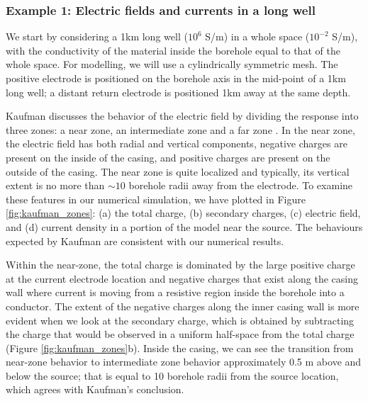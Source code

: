 \subsubsection{Example 1: Electric fields and currents in a long well}

We start by considering a 1km long well ($10^6$ S/m) in a whole space ($10^{-2}$ S/m), with the conductivity of the material inside the borehole equal to that of the whole space.  For modelling, we will use a cylindrically symmetric mesh. The positive electrode is positioned on the borehole axis in the mid-point of a 1km long well;  a distant return electrode is positioned 1km away at the same depth.

Kaufman discusses the behavior of the electric field by dividing the response into three zones: a near zone, an intermediate zone and a far zone \citep{Kaufman1990, Kaufman1993}. In the near zone, the electric field has both radial and vertical components, negative charges are present on the inside of the casing, and positive charges are present on the outside of the casing. The near zone is quite localized and typically, its vertical extent is no more than $\sim 10$ borehole radii away from the electrode. To examine these features in our numerical simulation, we have plotted in Figure \ref{fig:kaufman_zones}: (a)  the total charge, (b) secondary charges, (c) electric field, and (d) current density in a portion of the model near the source. The behaviours expected by Kaufman are consistent with our numerical results.

Within the near-zone, the total charge is dominated by the large positive charge at the current electrode location and negative charges that exist along the casing wall where current is moving from a resistive region inside the borehole into a conductor. The extent of the negative charges along the inner casing wall is more evident when we look at the secondary charge, which is obtained by subtracting the charge that would be observed in a uniform half-space from the total charge (Figure \ref{fig:kaufman_zones}b). Inside the casing, we can see the transition from near-zone behavior to intermediate zone behavior approximately 0.5 m above and below the source; that is equal to 10 borehole radii from the source location, which agrees with Kaufman's conclusion.

